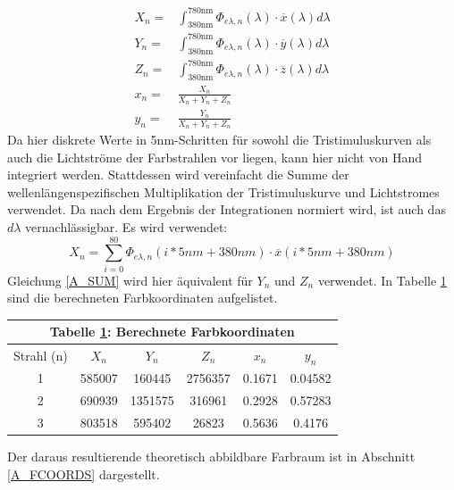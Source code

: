 \begin{eqnarray*}
X_n = & \int_{\mbox{380nm}}^{\mbox{780nm}} \Phi_{e\lambda,n}(\lambda)\cdot \overline{x}(\lambda)d\lambda \\
Y_n = & \int_{\mbox{380nm}}^{\mbox{780nm}} \Phi_{e\lambda,n}(\lambda)\cdot \overline{y}(\lambda)d\lambda \\
Z_n = & \int_{\mbox{380nm}}^{\mbox{780nm}} \Phi_{e\lambda,n}(\lambda)\cdot \overline{z}(\lambda)d\lambda \\
x_n = & \frac{X_n}{X_n+Y_n+Z_n} \\
y_n = & \frac{Y_n}{X_n+Y_n+Z_n}
\end{eqnarray*}
Da hier diskrete Werte in 5nm-Schritten für sowohl die Tristimuluskurven als auch die Lichtströme der Farbstrahlen vor liegen, kann hier nicht von Hand integriert werden. Stattdessen wird vereinfacht die Summe der wellenlängenspezifischen Multiplikation der Tristimuluskurve und Lichtstromes verwendet. Da nach dem Ergebnis der Integrationen normiert wird, ist auch das $d\lambda$ vernachlässigbar. Es wird verwendet:
\begin{equation}
X_n = \sum_{i=0}^{80} \Phi_{e\lambda,n}(i*5nm + 380nm) \cdot \overline{x}(i*5nm + 380nm)
\label{A_SUM}
\end{equation}
Gleichung \ref{A_SUM} wird hier äquivalent für $Y_n$ und $Z_n$ verwendet. In Tabelle \ref{A_COORDS} sind die berechneten Farbkoordinaten aufgelistet.

\begin{table}[h]
\label{A_COORDS}
\centering
\begin{tabular}{| c | c | c | c | c | c |}
\hline
\multicolumn{6}{|c|}{Tabelle \ref{A_COORDS}: Berechnete Farbkoordinaten} \\
\hline
Strahl (n) & $X_n$ & $Y_n$ & $Z_n$ & $x_n$ & $y_n$ \\
\hline
1 & 585007 & 160445 & 2756357 & 0.1671 & 0.04582 \\
2 & 690939 & 1351575 & 316961 & 0.2928 & 0.57283 \\
3 & 803518 & 595402 & 26823 & 0.5636 & 0.4176 \\
\hline
\end{tabular}
\end{table}
Der daraus resultierende theoretisch abbildbare Farbraum ist in Abschnitt \ref{A_FCOORDS} dargestellt.
